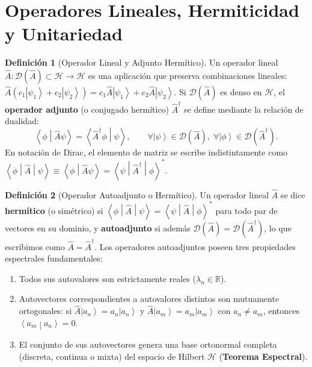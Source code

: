 \documentclass[11pt,a4paper,twoside]{report}
\theoremstyle{definition}
\newtheorem{definicion}{Definición}[chapter]
\theoremstyle{plain}
\theoremstyle{remark}
\newcommand{\ket}[1]{\left| #1 \right\rangle}
\newcommand{\braket}[2]{\left\langle #1 \middle| #2 \right\rangle}
\newcommand{\mel}[3]{\left\langle #1 \middle| #2 \middle| #3 \right\rangle}
\newcommand{\Hil}{\mathcal{H}}
\newcommand{\op}[1]{\hat{#1}}
\begin{document}
\section{Operadores Lineales, Hermiticidad y Unitariedad}

\begin{definicion}[Operador Lineal y Adjunto Hermítico]
Un operador lineal $\op{A}: \mathcal{D}(\op{A}) \subset \Hil \to \Hil$ es una aplicación que preserva combinaciones lineales: $\op{A}(c_1\ket{\psi_1} + c_2\ket{\psi_2}) = c_1\op{A}\ket{\psi_1} + c_2\op{A}\ket{\psi_2}$. Si $\mathcal{D}(\op{A})$ es denso en $\Hil$, el \textbf{operador adjunto} (o conjugado hermítico) $\op{A}^\dagger$ se define mediante la relación de dualidad:
\begin{equation}
    \braket{\phi}{\op{A}\psi} = \braket{\op{A}^\dagger \phi}{\psi}, \qquad \forall \ket{\psi} \in \mathcal{D}(\op{A}),\; \forall \ket{\phi} \in \mathcal{D}(\op{A}^\dagger).
\end{equation}
En notación de Dirac, el elemento de matriz se escribe indistintamente como $\mel{\phi}{\op{A}}{\psi} \equiv \braket{\phi}{\op{A}\psi} = \mel{\psi}{\op{A}^\dagger}{\phi}^*$.
\end{definicion}

\begin{definicion}[Operador Autoadjunto o Hermítico]
Un operador lineal $\op{A}$ se dice \textbf{hermítico} (o simétrico) si $\mel{\phi}{\op{A}}{\psi} = \mel{\psi}{\op{A}}{\phi}^*$ para todo par de vectores en su dominio, y \textbf{autoadjunto} si además $\mathcal{D}(\op{A}) = \mathcal{D}(\op{A}^\dagger)$, lo que escribimos como $\op{A} = \op{A}^\dagger$. Los operadores autoadjuntos poseen tres propiedades espectrales fundamentales:
\begin{enumerate}[label=\arabic*.]
    \item Todos sus autovalores son estrictamente reales ($\lambda_n \in \mathbb{R}$).
    \item Autovectores correspondientes a autovalores distintos son mutuamente ortogonales: si $\op{A}\ket{a_n} = a_n\ket{a_n}$ y $\op{A}\ket{a_m} = a_m\ket{a_m}$ con $a_n \neq a_m$, entonces $\braket{a_m}{a_n} = 0$.
    \item El conjunto de sus autovectores genera una base ortonormal completa (discreta, continua o mixta) del espacio de Hilbert $\Hil$ (\textbf{Teorema Espectral}).
\end{enumerate}
\end{definicion}
\end{document}
